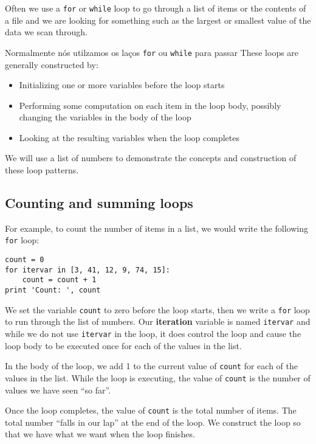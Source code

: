 Often we use a {\tt for} or {\tt while} loop to go through a list of items
or the contents of a file and we are looking for something such as
the largest or smallest value of the data we scan through.

Normalmente nós utilzamos os laços {\tt for} ou {\tt while} para passar 
These loops are generally constructed by:

\begin{itemize}

\item Initializing one or more variables before the loop starts

\item Performing some computation on each item in the loop body, 
possibly changing the variables in the body of the loop

\item Looking at the resulting variables when the loop completes

\end{itemize}

We will use a list of numbers to demonstrate the concepts and construction
of these loop patterns.  

\subsection{Counting and summing loops}

For example, to count the number of items
in a list, we would write the following {\tt for} loop:

\beforeverb
\begin{verbatim}
count = 0
for itervar in [3, 41, 12, 9, 74, 15]:
    count = count + 1
print 'Count: ', count
\end{verbatim}
\afterverb
%
We set the variable {\tt count} to zero before the loop starts,
then we write a {\tt for} loop to run through the list of numbers.
Our {\bf iteration} variable is named {\tt itervar} and while we do
not use {\tt itervar} in the loop, it does control the loop and cause
the loop body to be executed once for each of the values in the list.

In the body of the loop, we add 1 to the current value of {\tt count}
for each of the values in the list.  While the loop is executing, the 
value of {\tt count} is the number of values we have seen ``so far''.

Once the loop completes, the value of {\tt count} is the total number
of items.   The total number ``falls in our lap'' at the end of the 
loop.  We construct the loop so that we have what we want when the loop
finishes.

